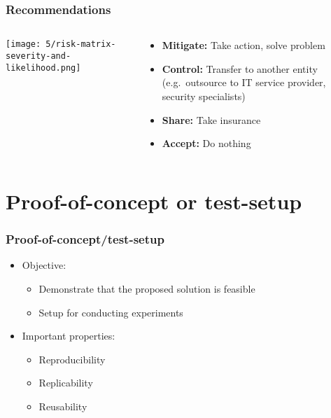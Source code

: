 \documentclass[aspectratio=169]{beamer}
\begin{document}
\begin{frame}
  \frametitle{Recommendations}

  \begin{columns}
    \begin{column}{.5\textwidth}
      \texttt{[image: 5/risk-matrix-severity-and-likelihood.png]}
    \end{column}

    \begin{column}{.5\textwidth}
      \begin{itemize}
        \item \textbf{Mitigate:} Take action, solve problem
        \item \textbf{Control:} Transfer to another entity (e.g.\ outsource to IT service provider, security specialists)
        \item \textbf{Share:} Take insurance
        \item \textbf{Accept:} Do nothing
      \end{itemize}
    \end{column}
  \end{columns}
\end{frame}


\section{Proof-of-concept or test-setup}

\begin{frame}
  \frametitle{Proof-of-concept/test-setup}

  \begin{itemize}
    \item Objective:
          \begin{itemize}
            \item Demonstrate that the proposed solution is feasible
            \item Setup for conducting experiments
          \end{itemize}
    \item Important properties:
          \begin{itemize}
            \item Reproducibility
            \item Replicability
            \item Reusability
          \end{itemize}
  \end{itemize}

\end{frame}
\end{document}
